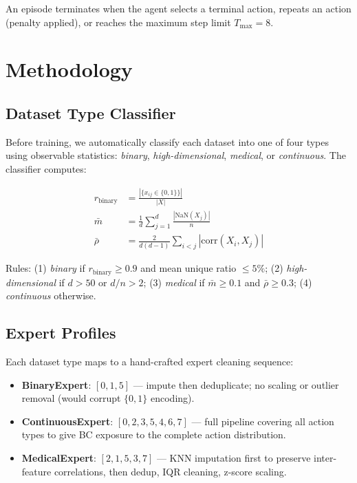 \documentclass[conference]{IEEEtran}
\begin{document}
An episode terminates when the agent selects a terminal action, repeats
an action (penalty applied), or reaches the maximum step limit
$T_{\max} = 8$.

\section{Methodology}
\label{sec:method}

\subsection{Dataset Type Classifier}

Before training, we automatically classify each dataset into one of four
types using observable statistics: \textit{binary}, \textit{high-dimensional},
\textit{medical}, or \textit{continuous}. The classifier computes:

\begin{align}
r_{\text{binary}} &= \frac{|\{x_{ij} \in \{0,1\}\}|}{|X|} \\
\bar{m} &= \frac{1}{d}\sum_{j=1}^{d} \frac{|\text{NaN}(X_j)|}{n} \\
\bar{\rho} &= \frac{2}{d(d-1)}\sum_{i<j} |\text{corr}(X_i, X_j)|
\end{align}

Rules: (1) \textit{binary} if $r_{\text{binary}} \geq 0.9$ and mean unique
ratio $\leq 5\%$; (2) \textit{high-dimensional} if $d > 50$ or $d/n > 2$;
(3) \textit{medical} if $\bar{m} \geq 0.1$ and $\bar{\rho} \geq 0.3$;
(4) \textit{continuous} otherwise.

\subsection{Expert Profiles}

Each dataset type maps to a hand-crafted expert cleaning sequence:

\begin{itemize}
    \item \textbf{BinaryExpert}: $[0, 1, 5]$ — impute then deduplicate;
    no scaling or outlier removal (would corrupt $\{0,1\}$ encoding).
    \item \textbf{ContinuousExpert}: $[0, 2, 3, 5, 4, 6, 7]$ — full pipeline
    covering all action types to give BC exposure to the complete action distribution.
    \item \textbf{MedicalExpert}: $[2, 1, 5, 3, 7]$ — KNN imputation first
    to preserve inter-feature correlations, then dedup, IQR cleaning, z-score scaling.
\end{itemize}
\end{document}
